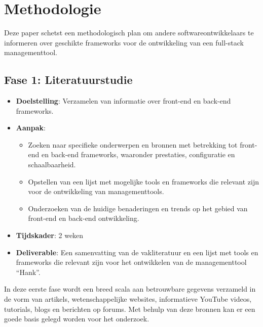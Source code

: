 \documentclass{hogent-article}
\begin{document}
\section{Methodologie}
Deze paper schetst een methodologisch plan om andere softwareontwikkelaars te informeren over geschikte frameworks voor de ontwikkeling van een full-stack managementtool.
\subsection*{Fase 1: Literatuurstudie}
\begin{itemize}
\item \textbf{Doelstelling}: Verzamelen van informatie over front-end en back-end frameworks.
\item \textbf{Aanpak}:
\begin{itemize}
\item Zoeken naar specifieke onderwerpen en bronnen met betrekking tot front-end en back-end frameworks, waaronder prestaties, configuratie en schaalbaarheid.
\item Opstellen van een lijst met mogelijke tools en frameworks die relevant zijn voor de ontwikkeling van managementtools.
\item Onderzoeken van de huidige benaderingen en trends op het gebied van front-end en back-end ontwikkeling.
\end{itemize}
\item \textbf{Tijdskader}: 2 weken
\item \textbf{Deliverable}: Een samenvatting van de vakliteratuur en een lijst met tools en frameworks die relevant zijn voor het ontwikkelen van de man\-age\-ment\-tool ``Hank''.
\end{itemize}
\bigbreak
In deze eerste fase wordt een breed scala aan betrouwbare gegevens verzameld in de vorm van artikels, wetenschappelijke websites, informatieve YouTube videos, tutorials, blogs en berichten op forums. Met behulp van deze bronnen kan er een goede basis gelegd worden voor het onderzoek.

\end{document}

